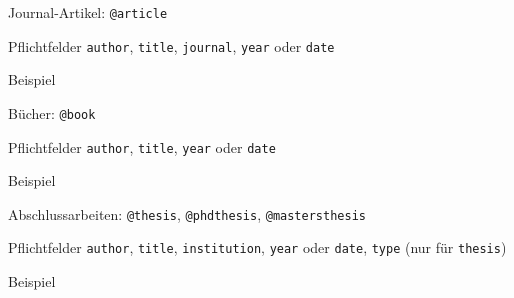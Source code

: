 \begin{frame}[fragile]{Journal-Artikel: \lstinline+@article+}
  \begin{block}{Pflichtfelder}
    \texttt{author}, \hspace{2em}
    \texttt{title}, \hspace{2em}
    \texttt{journal}, \hspace{2em}
    \texttt{year} oder \texttt{date}
  \end{block}

  \begin{block}{Beispiel}
    
  \end{block}

\end{frame}

\begin{frame}[fragile]{Bücher: \lstinline+@book+}
  \begin{block}{Pflichtfelder}
    \texttt{author}, \hspace{2em}
    \texttt{title}, \hspace{2em}
    \texttt{year} oder \texttt{date}
  \end{block}

  \begin{block}{Beispiel}
    
  \end{block}

\end{frame}

\begin{frame}[fragile]{Abschlussarbeiten: \lstinline+@thesis+, \lstinline+@phdthesis+, \lstinline+@mastersthesis+}
  \begin{block}{Pflichtfelder}
    \texttt{author}, \hspace{2em}
    \texttt{title}, \hspace{2em}
    \texttt{institution},  \hspace{2em}
    \texttt{year} oder \texttt{date},  \hspace{2em}
    \texttt{type} (nur für \lstinline+thesis+)
  \end{block}

  \begin{block}{Beispiel}
    
  \end{block}
\end{frame}

